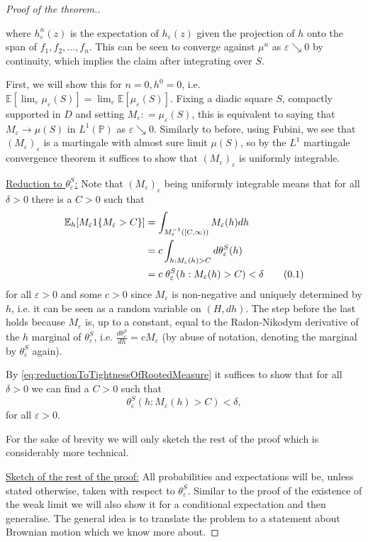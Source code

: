 \documentclass[11pt,reqno]{amsart}
\numberwithin{equation}{section}
\newcommand{\deq}{\mathrel{\mathop:}=}
\newcommand\numberthis{\addtocounter{equation}{1}\tag{\theequation}} %
\renewcommand\theequation{{\thesection}%
                   .{\arabic{equation}}}
\newcommand{\eps}{\varepsilon}
\begin{document}
\begin{proof}[Proof of the theorem.]
\begin{itemize}
			where $h^n_\eps(z)$ is the expectation of $h_\eps(z)$ given the projection of $h$ onto the span of $f_1,f_2,\dots,f_n$. This can be seen to converge against $\mu^n$ as $\eps\searrow 0$ by continuity, which implies the claim after integrating over $S$.
	\end{itemize}
	First, we will show this for $n=0, h^0=0$, i.e. $\mathbb E[\lim_\eps\mu_\eps(S)]=\lim_\eps\mathbb E[\mu_\eps(S)]$. Fixing a diadic square $S$, compactly supported in $D$ and setting $M_\eps\deq \mu_\eps(S)$, this is equivalent to saying that $M_\eps\rightarrow \mu(S)$ in $L^1(\mathbb P)$ as $\eps\searrow 0$. Similarly to before, using Fubini, we see that $(M_\eps)_\eps$ is a martingale with almost sure limit $\mu(S)$, so by the $L^1$ martingale convergence theorem it suffices to show that $(M_\eps)_\eps$ is uniformly integrable.
	
	\underline{Reduction to $\theta_\eps^S$:} Note that $(M_\eps)_\eps$ being uniformly integrable means that for all $\delta>0$ there is a $C>0$ such that 
	\begin{align*}
		\mathbb E_h[M_\eps 1\{M_\eps>C\}]
		&= \int_{M_\eps^{-1}([C,\infty))}M_\eps(h)dh\\
		&= c\int_{h:M_\eps(h)>C} d\theta_\eps^S(h)\\
		&= c\;\theta_\eps^S(h:M_\eps(h)>C)<\delta\numberthis\label{eq:reductionToTightnessOfRootedMeasure}
	\end{align*} for all $\eps>0$ and some $c>0$ since $M_\eps$ is non-negative and uniquely determined by $h$, i.e. it can be seen as a random variable on $(H, dh)$.
	The step before the last holds because $M_\eps$ is, up to a constant, equal to the Radon-Nikodym derivative of the $h$ marginal of $\theta^S_\eps$, i.e. $\frac{d\theta^S_\eps}{dh}=cM_\eps$ (by abuse of notation, denoting the marginal by $\theta^S_\eps$ again).
	
	By \eqref{eq:reductionToTightnessOfRootedMeasure} it suffices to show that for all $\delta>0$ we can find a $C>0$ such that \begin{equation}\label{eq:thetaTightness}
			\theta_\eps^S(h:M_\eps(h)>C)<\delta,
		\end{equation} for all $\eps>0$.
	
	For the sake of brevity we will only sketch the rest of the proof which is considerably more technical.
	
	\underline{Sketch of the rest of the proof:} All probabilities and expectations will be, unless stated otherwise, taken with respect to $\theta_\eps^S$. Similar to the proof of the existence of the weak limit we will also show it for a conditional expectation and then generalise. The general idea is to translate the problem to a statement about Brownian motion which we know more about.
	

\end{proof}
\end{document}
